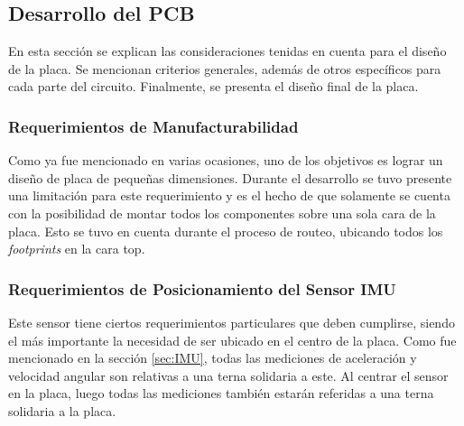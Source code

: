 \subsection{Desarrollo del PCB}

En esta sección se explican las consideraciones tenidas en cuenta para el diseño de la placa. Se mencionan criterios generales, además de otros específicos para cada parte del circuito. Finalmente, se presenta el diseño final de la placa.


\subsubsection{Requerimientos de Manufacturabilidad}\label{sec:requerimientos_manufacturabilidad}

Como ya fue mencionado en varias ocasiones, uno de los objetivos es lograr un diseño de placa de pequeñas dimensiones. %
Durante el desarrollo se tuvo presente una limitación para este requerimiento y es el hecho de que solamente se cuenta con la posibilidad de montar todos los componentes sobre una sola cara de la placa. Esto se tuvo en cuenta durante el proceso de routeo, ubicando todos los \textit{footprints} en la cara top.







\subsubsection{Requerimientos de Posicionamiento del Sensor IMU}

Este sensor tiene ciertos requerimientos particulares que deben cumplirse, siendo el más importante la necesidad de ser ubicado en el centro de la placa. Como fue mencionado en la sección \ref{sec:IMU}, todas las mediciones de aceleración y velocidad angular son relativas a una terna solidaria a este. Al centrar el sensor en la placa, luego todas las mediciones también estarán referidas a una terna solidaria a la placa.

